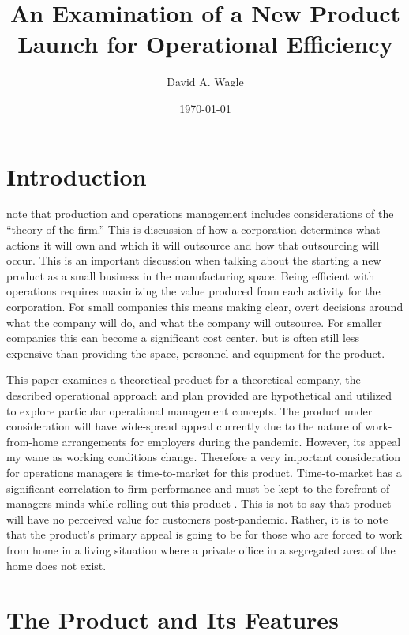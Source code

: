 \documentclass[man]{apa7}
\affiliation{North Central University}
\author{David A. Wagle}
\date{\today}
\title{An Examination of a New Product Launch for Operational Efficiency}
\begin{document}
\maketitle


\section{Introduction}
\label{sec:org6783052}

\Textcite{tsayReviewProductionOperations2018} note that production and operations management includes considerations of the ``theory of the firm.'' This is discussion of how a corporation determines what actions it will own and which it will outsource and how that outsourcing will occur. This is an important discussion when talking about the starting a new product as a small business in the manufacturing space. Being efficient with operations requires maximizing the value produced from each activity for the corporation. For small companies this means making clear, overt decisions around what the company will do, and what the company will outsource. For smaller companies this can become a significant cost center, but is often still less expensive than providing the space, personnel and equipment for the product.

This paper examines a theoretical product for a theoretical company, the described operational approach and plan provided are hypothetical and utilized to explore particular operational management concepts. The product under consideration will have wide-spread appeal currently due to the nature of work-from-home arrangements for employers during the pandemic. However, its appeal my wane as working conditions change. Therefore a very important consideration for operations managers is time-to-market for this product.  Time-to-market has a significant correlation to firm performance and must be kept to the forefront of managers minds while rolling out this product \parencite{keawkuntiRelationshipSupplyChain2020}. This is not to say that product will have no perceived value for customers post-pandemic. Rather, it is to note that the product's primary appeal is going to be for those who are forced to work from home in a living situation where a private office in a segregated area of the home does not exist.

\section{The Product and Its Features}
\label{sec:org1040828}
\end{document}
